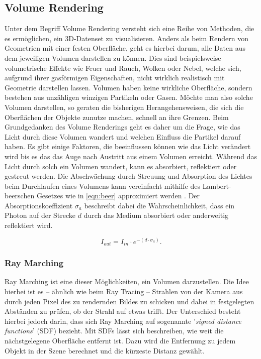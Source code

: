 \subsection{Volume Rendering}

Unter dem Begriff Volume Rendering versteht sich eine Reihe von Methoden, die es ermöglichen, ein 3D-Datenset zu visualisieren.
Anders als beim Rendern von Geometrien mit einer festen Oberfläche, geht es hierbei darum, alle Daten aus
dem jeweiligen Volumen darstellen zu können. Dies sind beispielsweise volumetrische Effekte wie Feuer und Rauch, Wolken oder Nebel,
welche sich, aufgrund ihrer gasförmigen Eigenschaften, nicht wirklich realistisch mit Geometrie darstellen lassen.
Volumen haben keine wirkliche Oberfläche, sondern bestehen aus unzähligen winzigen Partikeln oder Gasen.
Möchte man also solche Volumen darstellen, so geraten die bisherigen Herangehensweisen, die sich die Oberflächen der Objekte zunutze machen,
schnell an ihre Grenzen. Beim Grundgedanken des Volume Renderings geht es daher um die Frage, wie das Licht durch diese Volumen
wandert und welchen Einfluss die Partikel darauf haben.
Es gibt einige Faktoren, die beeinflussen können wie das Licht verändert wird bis es das das Auge nach Austritt aus einem Volumen erreicht.
Während das Licht durch solch ein Volumen wandert, kann es absorbiert, reflektiert oder gestreut werden.
Die Abschwächung durch Streuung und Absorption des Lichtes beim Durchlaufen eines Volumens kann vereinfacht mithilfe des Lambert-beerschen Gesetzes wie in \autoref{eqn:beer}
approximiert werden \parencite{Mayerhofer2020}.
Der Absorptionskoeffizient $\sigma_a$ beschreibt dabei die Wahrscheinlichkeit, dass ein Photon auf der Strecke $d$ durch das Medium absorbiert oder anderweitig
reflektiert wird.

\vspace{-0.5cm  }
\begin{equation}
	\label{eqn:beer}
	I_{out} = I_{in} \cdot e^{- ( d \cdot\sigma_a  )}.
\end{equation}





\subsubsection{Ray Marching}

Ray Marching ist eine dieser Möglichkeiten, ein Volumen darzustellen. Die Idee hierbei ist es – ähnlich wie beim Ray Tracing –
Strahlen von der Kamera aus durch jeden Pixel des zu rendernden Bildes zu schicken und dabei in festgelegten Abständen zu prüfen,
ob der Strahl auf etwas trifft.
Der Unterschied besteht hierbei jedoch darin, dass sich Ray Marching auf sogenannte '\textit{signed distance functions}' (SDF) bezieht.
Mit SDFs lässt sich beschreiben, wie weit die nächstgelegene Oberfläche entfernt ist. Dazu wird die Entfernung zu jedem Objekt
in der Szene berechnet und die kürzeste Distanz gewählt.

